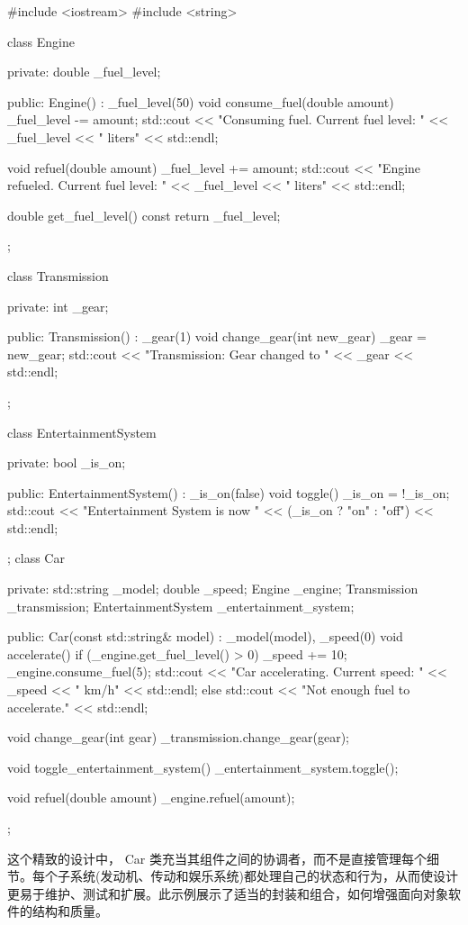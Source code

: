 \begin{cpp}
#include <iostream>
#include <string>

class Engine {
private:
    double _fuel_level;

public:
    Engine() : _fuel_level(50) {}
    void consume_fuel(double amount) {
        _fuel_level -= amount;
        std::cout << "Consuming fuel. Current fuel level: " << _fuel_level << " liters" << std::endl;
    }

    void refuel(double amount) {
        _fuel_level += amount;
        std::cout << "Engine refueled. Current fuel level: " << _fuel_level << " liters" << std::endl;
    }

    double get_fuel_level() const {
        return _fuel_level;
    }
};

class Transmission {
private:
    int _gear;

public:
    Transmission() : _gear(1) {}
    void change_gear(int new_gear) {
        _gear = new_gear;
        std::cout << "Transmission: Gear changed to " << _gear << std::endl;
    }
};

class EntertainmentSystem {
private:
    bool _is_on;

public:
    EntertainmentSystem() : _is_on(false) {}
    void toggle() {
        _is_on = !_is_on;
        std::cout << "Entertainment System is now " << (_is_on ? "on"
        : "off") << std::endl;
    }
};
class Car {
private:
    std::string _model;
    double _speed;
    Engine _engine;
    Transmission _transmission;
    EntertainmentSystem _entertainment_system;

public:
    Car(const std::string& model) : _model(model), _speed(0) {}
    void accelerate() {
        if (_engine.get_fuel_level() > 0) {
            _speed += 10;
            _engine.consume_fuel(5);
            std::cout << "Car accelerating. Current speed: " << _speed << " km/h" << std::endl;
        } else {
            std::cout << "Not enough fuel to accelerate." <<
            std::endl;
        }
    }

    void change_gear(int gear) {
        _transmission.change_gear(gear);
    }

    void toggle_entertainment_system() {
        _entertainment_system.toggle();
    }

    void refuel(double amount) {
        _engine.refuel(amount);
    }
};
\end{cpp}

这个精致的设计中， Car 类充当其组件之间的协调者，而不是直接管理每个细节。每个子系统(发动机、传动和娱乐系统)都处理自己的状态和行为，从而使设计更易于维护、测试和扩展。此示例展示了适当的封装和组合，如何增强面向对象软件的结构和质量。

